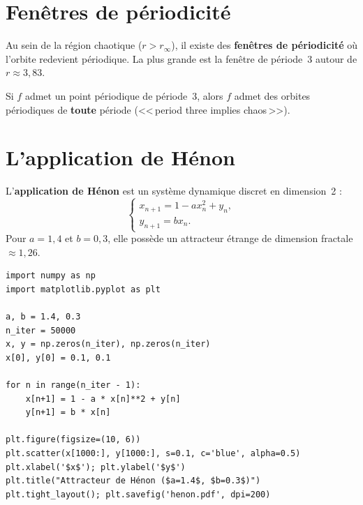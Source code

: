 \section{Fen\^etres de p\'eriodicit\'e}

\begin{remarque}
Au sein de la r\'egion chaotique ($r>r_\infty$), il existe des
\textbf{fen\^etres de p\'eriodicit\'e} o\`u l'orbite redevient
p\'eriodique.  La plus grande est la fen\^etre de p\'eriode~3
autour de $r\approx 3{,}83$.
\end{remarque}

\begin{theoreme}[Li--Yorke, 1975]
Si $f$ admet un point p\'eriodique de p\'eriode~3, alors $f$ admet
des orbites p\'eriodiques de \textbf{toute} p\'eriode
(<<\,period three implies chaos\,>>).
\end{theoreme}

\section{L'application de H\'enon}
\label{sec:henon}

\begin{definition}
L'\textbf{application de H\'enon} est un syst\`eme dynamique discret
en dimension~2 :
\[
  \begin{cases}
    x_{n+1} = 1 - ax_n^2 + y_n, \\
    y_{n+1} = bx_n.
  \end{cases}
\]
Pour $a=1{,}4$ et $b=0{,}3$, elle poss\`ede un attracteur \'etrange
de dimension fractale $\approx 1{,}26$.
\end{definition}

\begin{codeblock}[title=\textbf{Attracteur de H\'enon}]
\begin{verbatim}
import numpy as np
import matplotlib.pyplot as plt

a, b = 1.4, 0.3
n_iter = 50000
x, y = np.zeros(n_iter), np.zeros(n_iter)
x[0], y[0] = 0.1, 0.1

for n in range(n_iter - 1):
    x[n+1] = 1 - a * x[n]**2 + y[n]
    y[n+1] = b * x[n]

plt.figure(figsize=(10, 6))
plt.scatter(x[1000:], y[1000:], s=0.1, c='blue', alpha=0.5)
plt.xlabel('$x$'); plt.ylabel('$y$')
plt.title("Attracteur de Hénon ($a=1.4$, $b=0.3$)")
plt.tight_layout(); plt.savefig('henon.pdf', dpi=200)
\end{verbatim}
\end{codeblock}

